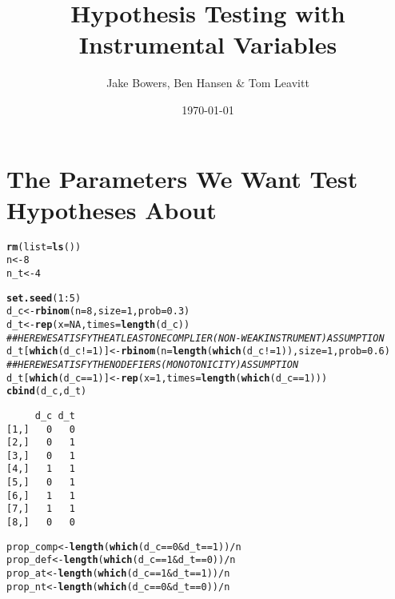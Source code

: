 \documentclass[11pt,leqno]{article}\usepackage[]{graphicx}\usepackage[]{color}
\title{Hypothesis Testing with Instrumental Variables}
\author{Jake Bowers, Ben Hansen \& Tom Leavitt}
\date{\today}
\makeatletter
\newcommand{\hlnum}[1]{\textcolor[rgb]{0.686,0.059,0.569}{#1}}%
\newcommand{\hlcom}[1]{\textcolor[rgb]{0.678,0.584,0.686}{\textit{#1}}}%
\newcommand{\hlopt}[1]{\textcolor[rgb]{0,0,0}{#1}}%
\newcommand{\hlstd}[1]{\textcolor[rgb]{0.345,0.345,0.345}{#1}}%
\newcommand{\hlkwb}[1]{\textcolor[rgb]{0.69,0.353,0.396}{#1}}%
\newcommand{\hlkwc}[1]{\textcolor[rgb]{0.333,0.667,0.333}{#1}}%
\newcommand{\hlkwd}[1]{\textcolor[rgb]{0.737,0.353,0.396}{\textbf{#1}}}%
\newenvironment{kframe}{%
 \def\at@end@of@kframe{}%
 \ifinner\ifhmode%
  \def\at@end@of@kframe{\end{minipage}}%
  \begin{minipage}{\columnwidth}%
 \fi\fi%
 \def\FrameCommand##1{\hskip\@totalleftmargin \hskip-\fboxsep
 \colorbox{shadecolor}{##1}\hskip-\fboxsep
     \hskip-\linewidth \hskip-\@totalleftmargin \hskip\columnwidth}%
 \MakeFramed {\advance\hsize-\width
   \@totalleftmargin\z@ \linewidth\hsize
   \@setminipage}}%
 {\par\unskip\endMakeFramed%
 \at@end@of@kframe}
\newenvironment{knitrout}{}{} %
\theoremstyle{newstyle}
\makeatother
\begin{document}
\maketitle



\section{The Parameters We Want Test Hypotheses About}

\begin{knitrout}\footnotesize
{}\color{fgcolor}\begin{kframe}
\begin{alltt}
\hlkwd{rm}\hlstd{(}\hlkwc{list} \hlstd{=} \hlkwd{ls}\hlstd{())}
\hlstd{n} \hlkwb{<-} \hlnum{8}
\hlstd{n_t} \hlkwb{<-} \hlnum{4}

\hlkwd{set.seed}\hlstd{(}\hlnum{1}\hlopt{:}\hlnum{5}\hlstd{)}
\hlstd{d_c} \hlkwb{<-} \hlkwd{rbinom}\hlstd{(}\hlkwc{n} \hlstd{=} \hlnum{8}\hlstd{,} \hlkwc{size} \hlstd{=} \hlnum{1}\hlstd{,} \hlkwc{prob} \hlstd{=} \hlnum{0.3}\hlstd{)}
\hlstd{d_t} \hlkwb{<-} \hlkwd{rep}\hlstd{(}\hlkwc{x} \hlstd{=} \hlnum{NA}\hlstd{,} \hlkwc{times} \hlstd{=} \hlkwd{length}\hlstd{(d_c))}
\hlcom{## HERE WE SATISFY THE AT LEAST ONE COMPLIER (NON-WEAK INSTRUMENT) ASSUMPTION}
\hlstd{d_t[}\hlkwd{which}\hlstd{(d_c} \hlopt{!=} \hlnum{1}\hlstd{)]} \hlkwb{<-} \hlkwd{rbinom}\hlstd{(}\hlkwc{n} \hlstd{=} \hlkwd{length}\hlstd{(}\hlkwd{which}\hlstd{(d_c} \hlopt{!=} \hlnum{1}\hlstd{)),} \hlkwc{size} \hlstd{=} \hlnum{1}\hlstd{,} \hlkwc{prob} \hlstd{=} \hlnum{0.6}\hlstd{)}
\hlcom{## HERE WE SATISFY THE NO DEFIERS (MONOTONICITY) ASSUMPTION}
\hlstd{d_t[}\hlkwd{which}\hlstd{(d_c} \hlopt{==} \hlnum{1}\hlstd{)]} \hlkwb{<-} \hlkwd{rep}\hlstd{(}\hlkwc{x} \hlstd{=} \hlnum{1}\hlstd{,} \hlkwc{times} \hlstd{=} \hlkwd{length}\hlstd{(}\hlkwd{which}\hlstd{(d_c} \hlopt{==} \hlnum{1}\hlstd{)))}
\hlkwd{cbind}\hlstd{(d_c, d_t)}
\end{alltt}
\begin{verbatim}
     d_c d_t
[1,]   0   0
[2,]   0   1
[3,]   0   1
[4,]   1   1
[5,]   0   1
[6,]   1   1
[7,]   1   1
[8,]   0   0
\end{verbatim}
\begin{alltt}
\hlstd{prop_comp} \hlkwb{<-} \hlkwd{length}\hlstd{(}\hlkwd{which}\hlstd{(d_c} \hlopt{==} \hlnum{0} \hlopt{&} \hlstd{d_t} \hlopt{==} \hlnum{1}\hlstd{))}\hlopt{/}\hlstd{n}
\hlstd{prop_def} \hlkwb{<-} \hlkwd{length}\hlstd{(}\hlkwd{which}\hlstd{(d_c} \hlopt{==} \hlnum{1} \hlopt{&} \hlstd{d_t} \hlopt{==} \hlnum{0}\hlstd{))}\hlopt{/}\hlstd{n}
\hlstd{prop_at} \hlkwb{<-} \hlkwd{length}\hlstd{(}\hlkwd{which}\hlstd{(d_c} \hlopt{==} \hlnum{1} \hlopt{&} \hlstd{d_t} \hlopt{==} \hlnum{1}\hlstd{))}\hlopt{/}\hlstd{n}
\hlstd{prop_nt} \hlkwb{<-} \hlkwd{length}\hlstd{(}\hlkwd{which}\hlstd{(d_c} \hlopt{==} \hlnum{0} \hlopt{&} \hlstd{d_t} \hlopt{==} \hlnum{0}\hlstd{))}\hlopt{/}\hlstd{n}


\end{alltt}
\end{kframe}
\end{knitrout}
\end{document}
